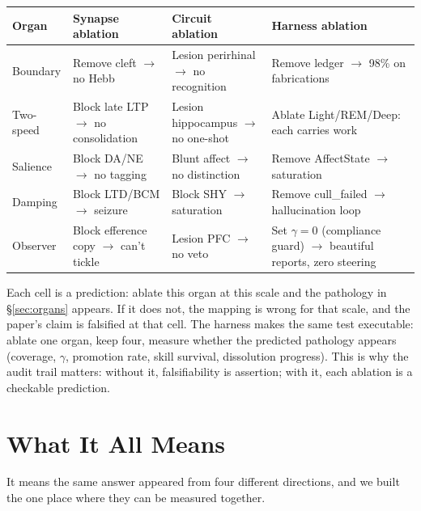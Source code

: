 \documentclass[11pt]{article}
\begin{document}
{\begin{center}
\small
\begin{tabular}{p{2.2cm}p{3.8cm}p{3.8cm}p{3.8cm}}
\toprule
Organ & Synapse ablation & Circuit ablation & Harness ablation \\
\midrule
Boundary & Remove cleft $\to$\allowbreak{} no Hebb & Lesion perirhinal $\to$\allowbreak{} no recognition & Remove ledger $\to$\allowbreak{} 98\% on fabrications \\
Two-speed & Block late LTP $\to$\allowbreak{} no consolidation & Lesion hippocampus $\to$\allowbreak{} no one-shot & Ablate Light/REM/Deep: each carries work \\
Salience & Block DA/NE $\to$\allowbreak{} no tagging & Blunt affect $\to$\allowbreak{} no distinction & Remove AffectState $\to$\allowbreak{} saturation \\
Damping & Block LTD/BCM $\to$\allowbreak{} seizure & Block SHY $\to$\allowbreak{} saturation & Remove cull\_failed $\to$\allowbreak{} hallucination loop \\
Observer & Block efference copy $\to$\allowbreak{} can't tickle & Lesion PFC $\to$\allowbreak{} no veto & Set $\gamma=0$ (compliance guard) $\to$\allowbreak{} beautiful reports, zero steering \\
\bottomrule
\end{tabular}
\end{center}

Each cell is a prediction: ablate this organ at this scale and the pathology in \S\ref{sec:organs} appears. If it does not, the mapping is wrong for that scale, and the paper's claim is falsified at that cell. The harness makes the same test executable: ablate one organ, keep four, measure whether the predicted pathology appears (coverage, $\gamma$, promotion rate, skill survival, dissolution progress). This is why the audit trail matters: without it, falsifiability is assertion; with it, each ablation is a checkable prediction.

\section{What It All Means}
\label{sec:what-it-all-means}

It means the same answer appeared from four different directions, and we built the one place where they can be measured together.

}
\end{document}

